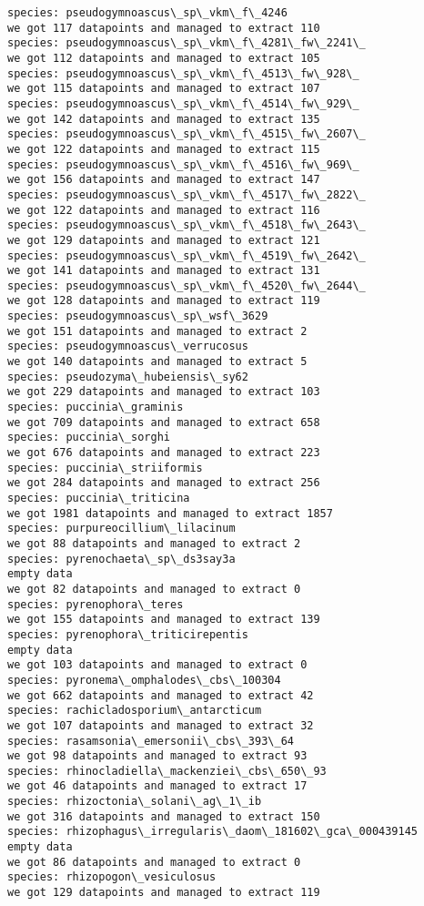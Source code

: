 \documentclass[11pt]{article}
\begin{document}
\begin{Verbatim}[commandchars=\\\{\}]
species: pseudogymnoascus\_sp\_vkm\_f\_4246
we got 117 datapoints and managed to extract 110
species: pseudogymnoascus\_sp\_vkm\_f\_4281\_fw\_2241\_
we got 112 datapoints and managed to extract 105
species: pseudogymnoascus\_sp\_vkm\_f\_4513\_fw\_928\_
we got 115 datapoints and managed to extract 107
species: pseudogymnoascus\_sp\_vkm\_f\_4514\_fw\_929\_
we got 142 datapoints and managed to extract 135
species: pseudogymnoascus\_sp\_vkm\_f\_4515\_fw\_2607\_
we got 122 datapoints and managed to extract 115
species: pseudogymnoascus\_sp\_vkm\_f\_4516\_fw\_969\_
we got 156 datapoints and managed to extract 147
species: pseudogymnoascus\_sp\_vkm\_f\_4517\_fw\_2822\_
we got 122 datapoints and managed to extract 116
species: pseudogymnoascus\_sp\_vkm\_f\_4518\_fw\_2643\_
we got 129 datapoints and managed to extract 121
species: pseudogymnoascus\_sp\_vkm\_f\_4519\_fw\_2642\_
we got 141 datapoints and managed to extract 131
species: pseudogymnoascus\_sp\_vkm\_f\_4520\_fw\_2644\_
we got 128 datapoints and managed to extract 119
species: pseudogymnoascus\_sp\_wsf\_3629
we got 151 datapoints and managed to extract 2
species: pseudogymnoascus\_verrucosus
we got 140 datapoints and managed to extract 5
species: pseudozyma\_hubeiensis\_sy62
we got 229 datapoints and managed to extract 103
species: puccinia\_graminis
we got 709 datapoints and managed to extract 658
species: puccinia\_sorghi
we got 676 datapoints and managed to extract 223
species: puccinia\_striiformis
we got 284 datapoints and managed to extract 256
species: puccinia\_triticina
we got 1981 datapoints and managed to extract 1857
species: purpureocillium\_lilacinum
we got 88 datapoints and managed to extract 2
species: pyrenochaeta\_sp\_ds3say3a
empty data
we got 82 datapoints and managed to extract 0
species: pyrenophora\_teres
we got 155 datapoints and managed to extract 139
species: pyrenophora\_triticirepentis
empty data
we got 103 datapoints and managed to extract 0
species: pyronema\_omphalodes\_cbs\_100304
we got 662 datapoints and managed to extract 42
species: rachicladosporium\_antarcticum
we got 107 datapoints and managed to extract 32
species: rasamsonia\_emersonii\_cbs\_393\_64
we got 98 datapoints and managed to extract 93
species: rhinocladiella\_mackenziei\_cbs\_650\_93
we got 46 datapoints and managed to extract 17
species: rhizoctonia\_solani\_ag\_1\_ib
we got 316 datapoints and managed to extract 150
species: rhizophagus\_irregularis\_daom\_181602\_gca\_000439145
empty data
we got 86 datapoints and managed to extract 0
species: rhizopogon\_vesiculosus
we got 129 datapoints and managed to extract 119

\end{Verbatim}
\end{document}
